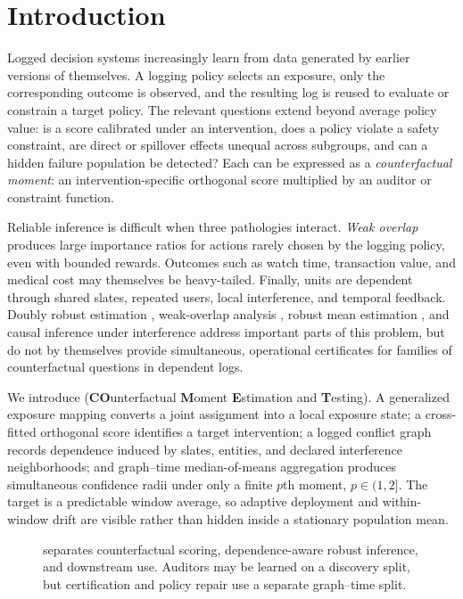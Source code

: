 \section{Introduction}
\label{sec:intro}

Logged decision systems increasingly learn from data generated by earlier versions of themselves. A logging policy selects an exposure, only the corresponding outcome is observed, and the resulting log is reused to evaluate or constrain a target policy. The relevant questions extend beyond average policy value: is a score calibrated under an intervention, does a policy violate a safety constraint, are direct or spillover effects unequal across subgroups, and can a hidden failure population be detected? Each can be expressed as a \emph{counterfactual moment}: an intervention-specific orthogonal score multiplied by an auditor or constraint function.

Reliable inference is difficult when three pathologies interact. \emph{Weak overlap} produces large importance ratios for actions rarely chosen by the logging policy, even with bounded rewards. Outcomes such as watch time, transaction value, and medical cost may themselves be heavy-tailed. Finally, units are dependent through shared slates, repeated users, local interference, and temporal feedback. Doubly robust estimation \citep{dudik2011doubly,jiang2016doubly,farajtabar2018more}, weak-overlap analysis \citep{wang2017optimal,mehrabi2024weak,khan2024beyond}, robust mean estimation \citep{lugosi2019mean}, and causal inference under interference \citep{aronow2017estimating,savje2021average} address important parts of this problem, but do not by themselves provide simultaneous, operational certificates for families of counterfactual questions in dependent logs.

We introduce \textbf{\COMET} (\textbf{CO}unterfactual \textbf{M}oment \textbf{E}stimation and \textbf{T}esting). A generalized exposure mapping converts a joint assignment into a local exposure state; a cross-fitted orthogonal score identifies a target intervention; a logged conflict graph records dependence induced by slates, entities, and declared interference neighborhoods; and graph--time median-of-means aggregation produces simultaneous confidence radii under only a finite $p$th moment, $p\in(1,2]$. The target is a predictable window average, so adaptive deployment and within-window drift are visible rather than hidden inside a stationary population mean.

\begin{figure}[t]
  \centering
  \resizebox{\linewidth}{!}{}
  \caption{\COMET separates counterfactual scoring, dependence-aware robust inference, and downstream use. Auditors may be learned on a discovery split, but certification and policy repair use a separate graph--time split.}
  \label{fig:overview}
\end{figure}

